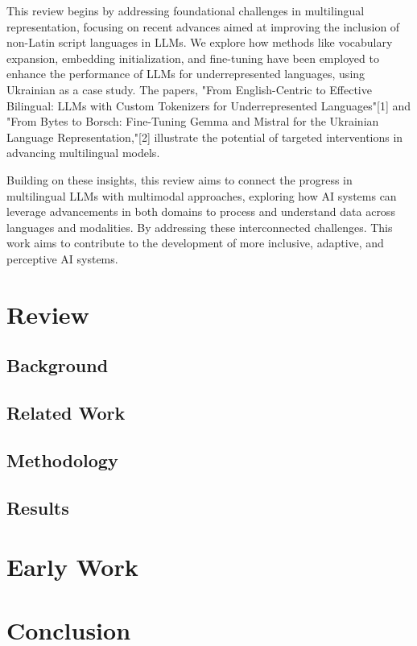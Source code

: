 \documentclass[12pt,a4]{article}
\begin{document}
    This review begins by addressing foundational challenges in multilingual representation, focusing 
    on recent advances aimed at improving the inclusion of non-Latin script languages in LLMs. 
    We explore how methods like vocabulary expansion, embedding initialization, and fine-tuning have been 
    employed to enhance the performance of LLMs for underrepresented languages, using Ukrainian as a case study. 
    The papers, "From English-Centric to Effective Bilingual: LLMs with Custom Tokenizers for Underrepresented 
    Languages"[1] and "From Bytes to Borsch: Fine-Tuning Gemma and Mistral for the Ukrainian Language Representation,"[2] 
    illustrate the potential of targeted interventions in advancing multilingual models.

    Building on these insights, this review aims to connect the progress in multilingual LLMs with 
    multimodal approaches, exploring how AI systems can leverage advancements in both domains to process 
    and understand data across languages and modalities. By addressing these interconnected challenges.
    This work aims to contribute to the development of more inclusive, adaptive, and perceptive AI systems.

  \section{Review}
    \subsection{Background}

    \subsection{Related Work}

    \subsection{Methodology}

    \subsection{Results}

  \section{Early Work}
    \label{submission}

  \section{Conclusion}
    \label{submission}
\end{document}
